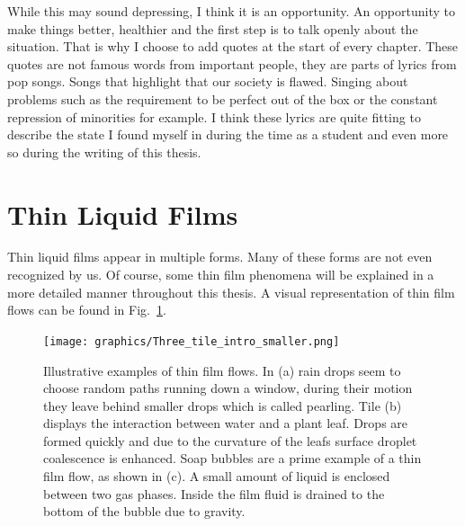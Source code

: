 While this may sound depressing, I think it is an opportunity.
An opportunity to make things better, healthier and the first step is to talk openly about the situation.
That is why I choose to add quotes at the start of every chapter.
These quotes are not famous words from important people, they are parts of lyrics from pop songs.
Songs that highlight that our society is flawed.
Singing about problems such as the requirement to be perfect out of the box or the constant repression of minorities for example.
I think these lyrics are quite fitting to describe the state I found myself in during the time as a student and even more so during the writing of this thesis.

\section{Thin Liquid Films}
Thin liquid films appear in multiple forms. 
Many of these forms are not even recognized by us.
Of course, some thin film phenomena will be explained in a more detailed manner throughout this thesis. 
A visual representation of thin film flows can be found in Fig.~\ref{fig:examples_intro}.
\begin{figure}
    \centering
    \texttt{[image: graphics/Three\_tile\_intro\_smaller.png]}
    \caption{Illustrative examples of thin film flows. In (a) rain drops seem to choose random paths running down a window, during their motion they leave behind smaller drops which is called pearling. Tile (b) displays the interaction between water and a plant leaf. Drops are formed quickly and due to the curvature of the leafs surface droplet coalescence is enhanced. Soap bubbles are a prime example of a thin film flow, as shown in (c). A small amount of liquid is enclosed between two gas phases. Inside the film fluid is drained to the bottom of the bubble due to gravity.}
    \label{fig:examples_intro}
\end{figure}


